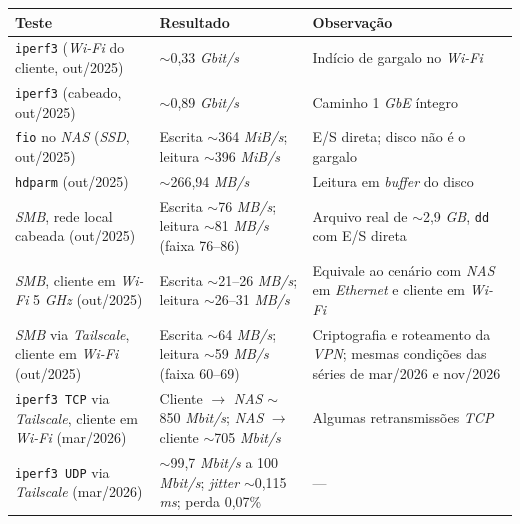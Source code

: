 \begin{quadro}[H]
    \centering
    \footnotesize
    \renewcommand{\arraystretch}{1.1}
    \begin{tabularx}{\linewidth}{|>{\raggedright\arraybackslash}X|>{\raggedright\arraybackslash}X|>{\raggedright\arraybackslash}X|}
        \hline
        \textbf{Teste} & \textbf{Resultado} & \textbf{Observação} \\
        \hline
        \hline
        \texttt{iperf3} (\textit{Wi-Fi} do cliente, out/2025) & $\sim$0,33 \textit{Gbit/s} & Indício de gargalo no \textit{Wi-Fi} \\
        \hline
        \texttt{iperf3} (cabeado, out/2025) & $\sim$0,89 \textit{Gbit/s} & Caminho 1 \textit{GbE} íntegro \\
        \hline
        \texttt{fio} no \textit{NAS} (\textit{SSD}, out/2025) & Escrita $\sim$364 \textit{MiB/s}; leitura $\sim$396 \textit{MiB/s} & E/S direta; disco não é o gargalo \\
        \hline
        \texttt{hdparm} (out/2025) & $\sim$266,94 \textit{MB/s} & Leitura em \textit{buffer} do disco \\
        \hline
        \textit{SMB}, rede local cabeada (out/2025) & Escrita $\sim$76 \textit{MB/s}; leitura $\sim$81 \textit{MB/s} (faixa 76--86) & Arquivo real de $\sim$2,9 \textit{GB}, \texttt{dd} com E/S direta \\
        \hline
        \textit{SMB}, cliente em \textit{Wi-Fi} 5 \textit{GHz} (out/2025) & Escrita $\sim$21--26 \textit{MB/s}; leitura $\sim$26--31 \textit{MB/s} & Equivale ao cenário com \textit{NAS} em \textit{Ethernet} e cliente em \textit{Wi-Fi} \\
        \hline
        \textit{SMB} via \textit{Tailscale}, cliente em \textit{Wi-Fi} (out/2025) & Escrita $\sim$64 \textit{MB/s}; leitura $\sim$59 \textit{MB/s} (faixa 60--69) & Criptografia e roteamento da \textit{VPN}; mesmas condições das séries de mar/2026 e nov/2026 \\
        \hline
        \texttt{iperf3 TCP} via \textit{Tailscale}, cliente em \textit{Wi-Fi} (mar/2026) & Cliente $\rightarrow$ \textit{NAS} $\sim$850 \textit{Mbit/s}; \textit{NAS} $\rightarrow$ cliente $\sim$705 \textit{Mbit/s} & Algumas retransmissões \textit{TCP} \\
        \hline
        \texttt{iperf3 UDP} via \textit{Tailscale} (mar/2026) & $\sim$99,7 \textit{Mbit/s} a 100 \textit{Mbit/s}; \textit{jitter} $\sim$0,115 \textit{ms}; perda 0,07\% & --- \\

\end{tabularx}
\end{quadro}
